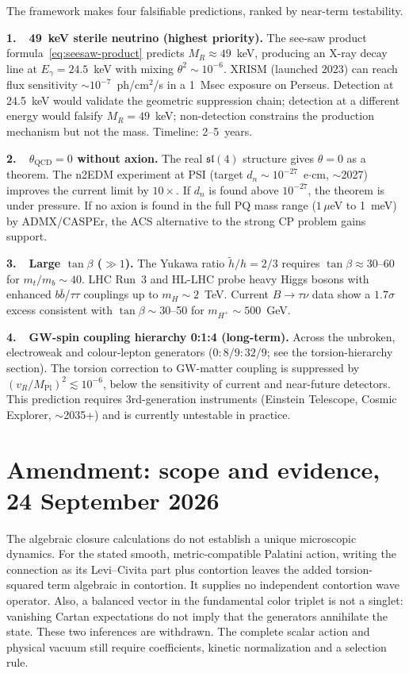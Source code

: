 \documentclass[11pt,a4paper]{article}
\theoremstyle{plain}
\theoremstyle{definition}
\theoremstyle{remark}
\begin{document}
The framework makes four falsifiable predictions, ranked by near-term
testability.

\textbf{1.\ \ 49~keV sterile neutrino (highest priority).}
The see-saw product formula~\eqref{eq:seesaw-product} predicts
$M_R \approx 49$~keV, producing an X-ray decay line at $E_\gamma = 24.5$~keV
with mixing $\theta^2 \sim 10^{-6}$.
XRISM (launched 2023) can reach flux sensitivity $\sim 10^{-7}$~ph/cm$^2$/s
in a 1~Msec exposure on Perseus.
Detection at 24.5~keV would validate the geometric suppression chain;
detection at a different energy would falsify $M_R = 49$~keV;
non-detection constrains the production mechanism but not the mass.
Timeline: 2--5~years.

\textbf{2.\ \ $\theta_{\mathrm{QCD}} = 0$ without axion.}
The real $\mathfrak{sl}(4)$ structure gives $\theta = 0$ as a theorem.
The n2EDM experiment at PSI (target $d_n \sim 10^{-27}$~e$\cdot$cm, $\sim$2027)
improves the current limit by $10\times$.  If $d_n$ is found above
$10^{-27}$, the theorem is under pressure.  If no axion is found in the
full PQ mass range ($1\,\mu$eV to 1~meV) by ADMX/CASPEr, the ACS
alternative to the strong CP problem gains support.

\textbf{3.\ \ Large $\tan\beta$ ($\gg 1$).}
The Yukawa ratio $\tilde{h}/h = 2/3$ requires $\tan\beta \approx 30$--$60$
for $m_t/m_b \sim 40$.  LHC Run~3 and HL-LHC probe heavy Higgs bosons with
enhanced $b\bar{b}$/$\tau\tau$ couplings up to $m_H \sim 2$~TeV.
Current $B \to \tau\nu$ data show a $1.7\sigma$ excess consistent with
$\tan\beta \sim 30$--50 for $m_{H^+} \sim 500$~GeV.

\textbf{4.\ \ GW-spin coupling hierarchy 0:1:4 (long-term).}
Across the unbroken, electroweak and colour-lepton generators
($0 : 8/9 : 32/9$; see the torsion-hierarchy section).
The torsion correction to GW-matter coupling is suppressed by
$(v_R/M_{\mathrm{Pl}})^2 \lesssim 10^{-6}$, below the sensitivity of
current and near-future detectors.  This prediction requires
3rd-generation instruments (Einstein Telescope, Cosmic Explorer, $\sim$2035+)
and is currently untestable in practice.


\section*{Amendment: scope and evidence, 24 September 2026}
The algebraic closure calculations do not establish a unique microscopic dynamics. For the stated smooth, metric-compatible Palatini action, writing the connection as its Levi--Civita part plus contortion leaves the added torsion-squared term algebraic in contortion. It supplies no independent contortion wave operator. Also, a balanced vector in the fundamental color triplet is not a singlet: vanishing Cartan expectations do not imply that the generators annihilate the state. These two inferences are withdrawn. The complete scalar action and physical vacuum still require coefficients, kinetic normalization and a selection rule.
\end{document}
